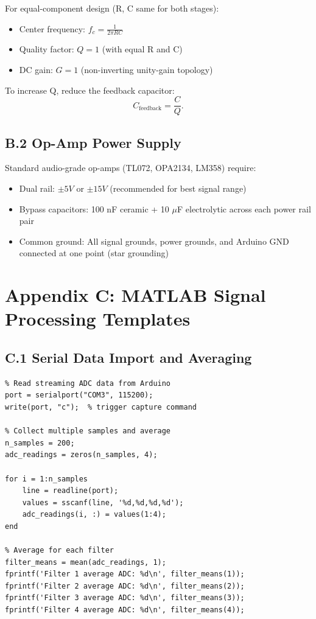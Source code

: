 \documentclass[11pt,letterpaper]{article}
\begin{document}
For equal-component design (R, C same for both stages):
\begin{itemize}
    \item Center frequency: $f_c = \frac{1}{2\pi RC}$
    \item Quality factor: $Q = 1$ (with equal R and C)
    \item DC gain: $G = 1$ (non-inverting unity-gain topology)
\end{itemize}

To increase Q, reduce the feedback capacitor:
\begin{equation}
C_{\text{feedback}} = \frac{C}{Q}.
\end{equation}

\subsection*{B.2 Op-Amp Power Supply}

Standard audio-grade op-amps (TL072, OPA2134, LM358) require:
\begin{itemize}
    \item Dual rail: $\pm 5V$ or $\pm 15V$ (recommended for best signal range)
    \item Bypass capacitors: 100 nF ceramic + 10 $\mu$F electrolytic across each power rail pair
    \item Common ground: All signal grounds, power grounds, and Arduino GND connected at one point (star grounding)
\end{itemize}

\clearpage

\section*{Appendix C: MATLAB Signal Processing Templates}

\subsection*{C.1 Serial Data Import and Averaging}

\begin{verbatim}
% Read streaming ADC data from Arduino
port = serialport("COM3", 115200);
write(port, "c");  % trigger capture command

% Collect multiple samples and average
n_samples = 200;
adc_readings = zeros(n_samples, 4);

for i = 1:n_samples
    line = readline(port);
    values = sscanf(line, '%d,%d,%d,%d');
    adc_readings(i, :) = values(1:4);
end

% Average for each filter
filter_means = mean(adc_readings, 1);
fprintf('Filter 1 average ADC: %d\n', filter_means(1));
fprintf('Filter 2 average ADC: %d\n', filter_means(2));
fprintf('Filter 3 average ADC: %d\n', filter_means(3));
fprintf('Filter 4 average ADC: %d\n', filter_means(4));
\end{verbatim}
\end{document}
